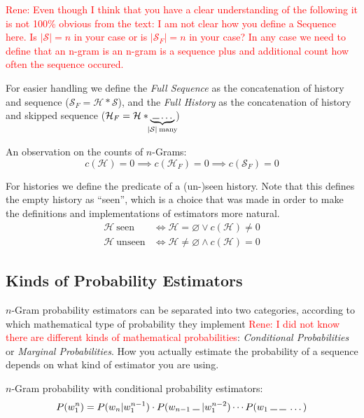 \documentclass[11pt,a4paper]{article}
\newcommand{\Seq}{\mathcal{S}}
\newcommand{\Hist}{\mathcal{H}}
\newcommand{\SeqF}{\mathcal{S}_F}
\newcommand{\HistF}{\mathcal{H}_F}
\newcommand{\Skp}{\rule{7pt}{.5pt}}
\newcommand{\rp}[1]{\textcolor{red}{Rene: #1}}
\begin{document}
  \rp{Even though I think that you have a clear understanding of the following
  it is not 100\% obvious from the text: I am not clear how you define a
  Sequence here. Is $|\Seq|=n$ in your case or is $|\SeqF|=n$ in your case?
  In any case we need to define that an n-gram is an n-gram is a sequence plus
  and additional count how often the sequence occured.}

  For easier handling we define the \emph{Full Sequence} as the concatenation
  of history and sequence ($\SeqF = \Hist * \Seq$), and the \emph{Full History}
  as the concatenation of history and skipped sequence
  ($\HistF = \Hist * \underbrace{\: \Skp \dotso \:}_{\mathclap{|\Seq| \: \text{many}}}$)

  An observation on the counts of $n$-Grams:
  \begin{equation}
    c(\Hist) = 0 \implies c(\HistF) = 0 \implies c(\SeqF) = 0
  \end{equation}

  For histories we define the predicate of a (un-)seen history. Note that this
  defines the empty history as ``seen'', which is a choice that was made in
  order to make the definitions and implementations of estimators more natural.
  \begin{equation}
    \begin{aligned}
      \Hist \: \mathrm{seen} &\iff \Hist = \varnothing \lor c(\Hist) \neq 0 \\
      \Hist \: \mathrm{unseen} &\iff \Hist \neq \varnothing \land c(\Hist) = 0
    \end{aligned}
  \end{equation}

  \subsection{Kinds of Probability Estimators}

  $n$-Gram probability estimators can be separated into two categories,
  according to which mathematical type of probability they implement
  \rp{I did not know there are different kinds of mathematical probabilities}:
  \emph{Conditional Probabilities} or \emph{Marginal Probabilities}. How you
  actually estimate the probability of a sequence depends on what kind of
  estimator you are using.

  $n$-Gram probability with conditional probability estimators:
  \begin{equation}
    P(w_1^n) = P(w_n | w_1^{n-1}) \cdot P(w_{n-1} \: \Skp \: | w_1^{n-2}) \dotsm P(w_1 \: \Skp \: \Skp \: \dotso)
  \end{equation}
\end{document}

